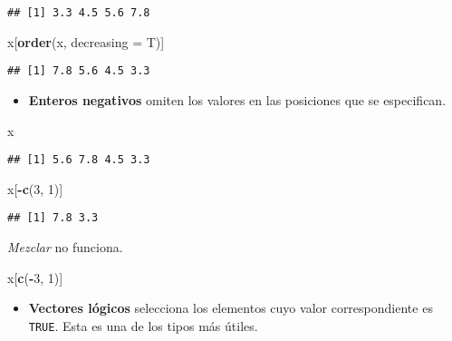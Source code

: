 \documentclass[]{article}
\newenvironment{Shaded}{\begin{snugshade}}{\end{snugshade}}
\newcommand{\KeywordTok}[1]{\textcolor[rgb]{0.13,0.29,0.53}{\textbf{#1}}}
\newcommand{\DataTypeTok}[1]{\textcolor[rgb]{0.13,0.29,0.53}{#1}}
\newcommand{\DecValTok}[1]{\textcolor[rgb]{0.00,0.00,0.81}{#1}}
\newcommand{\OperatorTok}[1]{\textcolor[rgb]{0.81,0.36,0.00}{\textbf{#1}}}
\newcommand{\NormalTok}[1]{#1}
\providecommand{\tightlist}{%
  \setlength{\itemsep}{0pt}\setlength{\parskip}{0pt}}
\begin{document}
\begin{verbatim}
## [1] 3.3 4.5 5.6 7.8
\end{verbatim}

\begin{Shaded}
\begin{Highlighting}[]
\NormalTok{x[}\KeywordTok{order}\NormalTok{(x, }\DataTypeTok{decreasing =}\NormalTok{ T)]}
\end{Highlighting}
\end{Shaded}

\begin{verbatim}
## [1] 7.8 5.6 4.5 3.3
\end{verbatim}

\begin{itemize}
\tightlist
\item
  \textbf{Enteros negativos} omiten los valores en las posiciones que se
  especifican.
\end{itemize}

\begin{Shaded}
\begin{Highlighting}[]
\NormalTok{x}
\end{Highlighting}
\end{Shaded}

\begin{verbatim}
## [1] 5.6 7.8 4.5 3.3
\end{verbatim}

\begin{Shaded}
\begin{Highlighting}[]
\NormalTok{x[}\OperatorTok{-}\KeywordTok{c}\NormalTok{(}\DecValTok{3}\NormalTok{, }\DecValTok{1}\NormalTok{)]}
\end{Highlighting}
\end{Shaded}

\begin{verbatim}
## [1] 7.8 3.3
\end{verbatim}

\emph{Mezclar} no funciona.

\begin{Shaded}
\begin{Highlighting}[]
\NormalTok{x[}\KeywordTok{c}\NormalTok{(}\OperatorTok{-}\DecValTok{3}\NormalTok{, }\DecValTok{1}\NormalTok{)]}
\end{Highlighting}
\end{Shaded}

\begin{itemize}
\tightlist
\item
  \textbf{Vectores lógicos} selecciona los elementos cuyo valor
  correspondiente es \texttt{TRUE}. Esta es una de los tipos más útiles.
\end{itemize}
\end{document}
